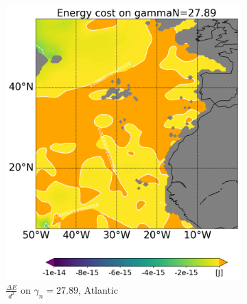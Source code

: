 \begin{figure}[htbp]
\begin{subfigure}[b]{0.4\textwidth}
         \includegraphics[width=\textwidth]{plots/energy/atlantic_energy/Map2dcyl_neg_energy_on_gammaN_2789e-2_reg310Eto360E05Nto57N_1990to1998av_WOCE.png}
         \caption{$\frac{\Delta E}{d^2}$ on $\gamma_n = 27.89$, Atlantic}
         \label{fig:subplot_atlantic_neg_energy_gamma_n}
     \end{subfigure}
     \hfill
     \begin{subfigure}[b]{0.4\textwidth}
         

\end{subfigure}
\end{figure}
